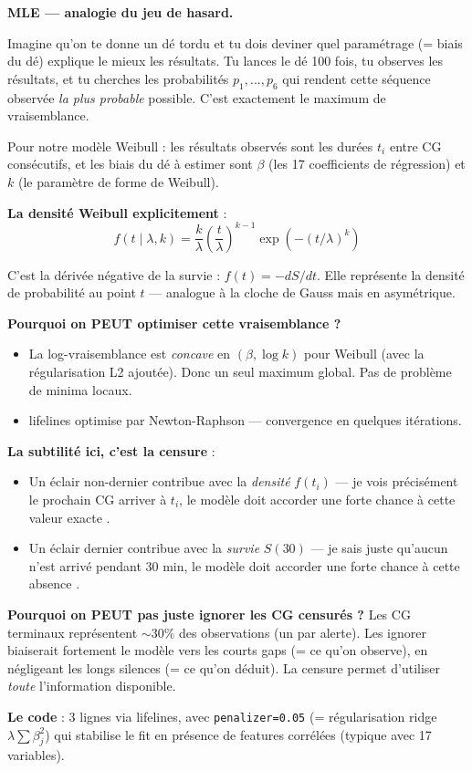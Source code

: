 \documentclass[11pt,a4paper]{article}
\begin{document}
\begin{compr}
\textbf{MLE — analogie du jeu de hasard.}

Imagine qu'on te donne un dé tordu et tu dois deviner quel paramétrage (= biais du dé)
explique le mieux les résultats. Tu lances le dé 100 fois, tu observes les résultats,
et tu cherches les probabilités $p_1, ..., p_6$ qui rendent cette séquence observée
\emph{la plus probable} possible. C'est exactement le maximum de vraisemblance.

Pour notre modèle Weibull : les \og résultats observés \fg{} sont les durées $t_i$ entre
CG consécutifs, et les \og biais du dé \fg{} à estimer sont $\beta$ (les 17 coefficients
de régression) et $k$ (le paramètre de forme de Weibull).

\textbf{La densité Weibull explicitement} :
$$f(t \mid \lambda, k) = \frac{k}{\lambda} \left(\frac{t}{\lambda}\right)^{k-1} \exp\!\left(-(t/\lambda)^k\right)$$

C'est la dérivée négative de la survie : $f(t) = -dS/dt$. Elle représente la
\og densité de probabilité \fg{} au point $t$ — analogue à la cloche de Gauss mais en
asymétrique.

\textbf{Pourquoi on PEUT optimiser cette vraisemblance ?}
\begin{itemize}[topsep=2pt]
    \item La log-vraisemblance est \emph{concave} en $(\beta, \log k)$ pour Weibull (avec
    la régularisation L2 ajoutée). Donc un seul maximum global. Pas de problème de
    minima locaux.
    \item lifelines optimise par Newton-Raphson — convergence en quelques itérations.
\end{itemize}

\textbf{La subtilité ici, c'est la censure} :
\begin{itemize}[topsep=2pt]
    \item Un éclair non-dernier contribue avec la \emph{densité} $f(t_i)$ — \og je vois
    précisément le prochain CG arriver à $t_i$, le modèle doit accorder une forte chance
    à cette valeur exacte \fg{}.
    \item Un éclair dernier contribue avec la \emph{survie} $S(30)$ — \og je sais juste
    qu'aucun n'est arrivé pendant 30 min, le modèle doit accorder une forte chance à cette
    absence \fg{}.
\end{itemize}

\textbf{Pourquoi on PEUT pas juste ignorer les CG censurés ?}
Les CG terminaux représentent $\sim 30 \%$ des observations (un par alerte). Les ignorer
biaiserait fortement le modèle vers les courts gaps (= ce qu'on observe), en négligeant
les longs silences (= ce qu'on déduit). La censure permet d'utiliser \emph{toute}
l'information disponible.

\textbf{Le code} : 3 lignes via lifelines, avec \texttt{penalizer=0.05} (= régularisation
ridge $\lambda \sum \beta_j^2$) qui stabilise le fit en présence de features corrélées
(typique avec 17 variables).
\end{compr}
\end{document}
